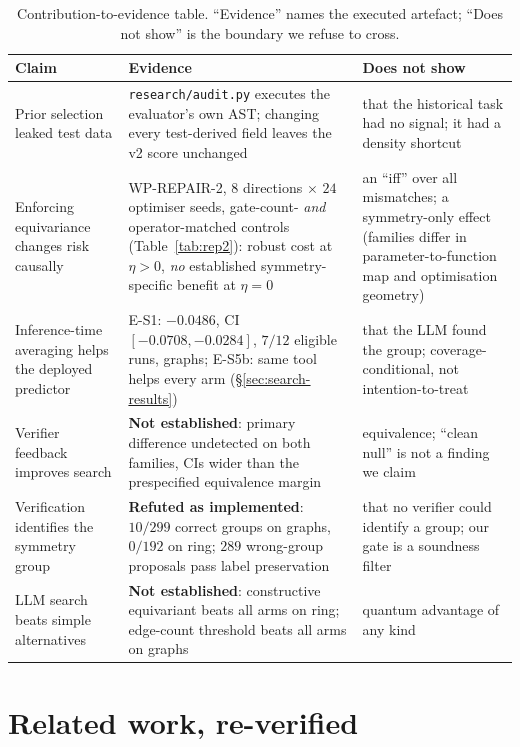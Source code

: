 \documentclass{neurips_2024}
\begin{document}
\begin{table}[t]
\centering
\caption{Contribution-to-evidence table. ``Evidence'' names the executed artefact;
``Does not show'' is the boundary we refuse to cross.}
\label{tab:contribution}
\small
\begin{tabular}{@{}p{}p{}p{}@{}}
\toprule
Claim & Evidence & Does not show \\
\midrule
Prior selection leaked test data &
\texttt{research/audit.py} executes the evaluator's own AST; changing every test-derived
field leaves the v2 score unchanged &
that the historical task had no signal; it had a density shortcut \\
\midrule
Enforcing equivariance changes risk causally &
WP-REPAIR-2, $8$ directions $\times$ $24$ optimiser seeds, gate-count- \emph{and}
operator-matched controls (Table~\ref{tab:rep2}): robust cost at $\eta{>}0$, \emph{no}
established symmetry-specific benefit at $\eta{=}0$ &
an ``iff'' over all mismatches; a symmetry-only effect (families differ in
parameter-to-function map and optimisation geometry) \\
\midrule
Inference-time averaging helps the deployed predictor &
E-S1: $-0.0486$, CI $[-0.0708,-0.0284]$, $7/12$ eligible runs, graphs; E-S5b: same tool
helps every arm (\S\ref{sec:search-results}) &
that the LLM found the group; coverage-conditional, not intention-to-treat \\
\midrule
Verifier feedback improves search &
\textbf{Not established}: primary difference undetected on both families, CIs wider than
the prespecified equivalence margin &
equivalence; ``clean null'' is not a finding we claim \\
\midrule
Verification identifies the symmetry group &
\textbf{Refuted as implemented}: $10/299$ correct groups on graphs, $0/192$ on ring;
$289$ wrong-group proposals pass label preservation &
that no verifier could identify a group; our gate is a soundness filter \\
\midrule
LLM search beats simple alternatives &
\textbf{Not established}: constructive equivariant beats all arms on ring; edge-count
threshold beats all arms on graphs &
quantum advantage of any kind \\
\bottomrule
\end{tabular}
\end{table}

\section{Related work, re-verified}
\label{sec:related}
\end{document}

